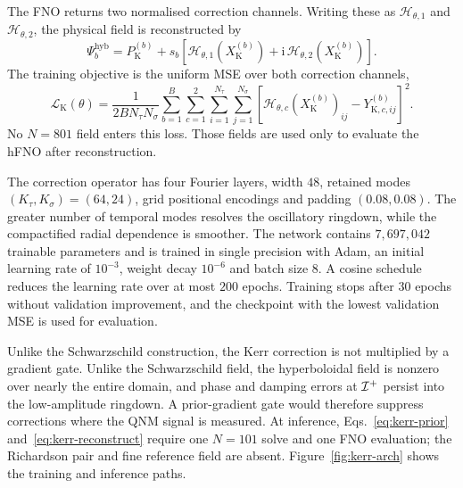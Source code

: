 The FNO returns two normalised correction channels. Writing these as
$\mathcal H_{\theta,1}$ and $\mathcal H_{\theta,2}$, the physical
field is reconstructed by
\begin{equation}
  \Psi^{\mathrm{hyb}}_b
  =P_{\mathrm K}^{(b)}
   +s_b\left[
      \mathcal H_{\theta,1}(X_{\mathrm K}^{(b)})
      +\mathrm i\,\mathcal H_{\theta,2}(X_{\mathrm K}^{(b)})
    \right].
  \label{eq:kerr-reconstruct}
\end{equation}
The training objective is the uniform MSE over both correction
channels,
\begin{equation}
  \mathcal L_{\mathrm K}(\theta)
  =\frac{1}{2BN_\tau N_\sigma}
   \sum_{b=1}^{B}\sum_{c=1}^{2}
   \sum_{i=1}^{N_\tau}\sum_{j=1}^{N_\sigma}
   \left[
     \mathcal H_{\theta,c}(X_{\mathrm K}^{(b)})_{ij}
     -Y_{\mathrm K,c,ij}^{(b)}
   \right]^2.
  \label{eq:kerr-loss}
\end{equation}
No $N=801$ field enters this loss. Those fields are used only to
evaluate the hFNO after reconstruction.

The correction operator has four Fourier layers, width $48$, retained
modes $(K_\tau,K_\sigma)=(64,24)$, grid positional encodings and
padding $(0.08,0.08)$. The greater number of temporal modes resolves
the oscillatory ringdown, while the compactified radial dependence is
smoother. The network contains $7{,}697{,}042$ trainable parameters
and is trained in single precision with Adam, an initial learning
rate of $10^{-3}$, weight decay $10^{-6}$ and batch size $8$. A
cosine schedule reduces the learning rate over at most $200$ epochs.
Training stops after $30$ epochs without validation improvement, and
the checkpoint with the lowest validation MSE is used for evaluation.

Unlike the Schwarzschild construction, the Kerr correction is not
multiplied by a gradient gate. Unlike the Schwarzschild field, the
hyperboloidal field is nonzero over nearly the entire domain, and
phase and damping errors at $\mathcal{I}^{+}$ persist into the low-amplitude
ringdown. A prior-gradient gate would
therefore suppress corrections where the QNM signal is measured. At
inference, Eqs.~\eqref{eq:kerr-prior}
and~\eqref{eq:kerr-reconstruct} require one $N=101$ solve and one FNO
evaluation; the Richardson pair and fine reference field are absent.
Figure~\ref{fig:kerr-arch} shows the training and inference paths.

